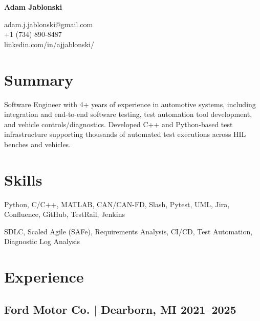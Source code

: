 \documentclass[11pt]{article}
\begin{document}
\pagestyle{empty}

\begin{center}
  \begin{minipage}{0.45\textwidth}
    {\Huge\bfseries
      Adam Jablonski
    }
  \end{minipage} \hfill
  \begin{minipage}{0.5\textwidth}
    \raggedleft
    adam.j.jablonski@gmail.com \\
    +1 (734) 890-8487 \\
    linkedin.com/in/ajjablonski/
  \end{minipage}
\end{center}

\section{Summary}
\noindent 
Software Engineer with 4+ years of experience in automotive systems, including 
integration and end-to-end software testing, test automation tool development, and vehicle 
controls/diagnostics. Developed C++ and Python-based test infrastructure supporting 
thousands of automated test executions across HIL benches and vehicles.

\section{Skills}
\begin{description}[itemsep=0pt]
  \item[Tools] Python, C/C++, MATLAB, CAN/CAN-FD, Slash, Pytest, UML, Jira, Confluence, GitHub, TestRail, Jenkins
  \item[Practices] SDLC, Scaled Agile (SAFe), Requirements Analysis, CI/CD, 
  Test Automation, Diagnostic Log Analysis
\end{description}

\section{Experience}
\subsection{Ford Motor Co. $|$ {\normalfont Dearborn, MI} \hfill 2021--2025}
\end{document}
